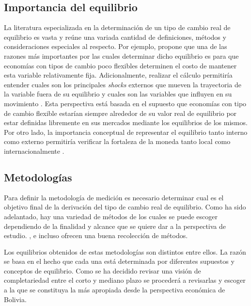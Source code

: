 \documentclass[12pt,letterpaper]{article}
\begin{document}
\subsection*{Importancia del equilibrio}
La literatura especializada en la determinación de un tipo de cambio real de equilibrio es vasta y reúne una variada cantidad de definiciones, métodos y consideraciones especiales al respecto. Por ejemplo, \cite{driver2005concepts} propone que una de las razones más importantes por las cuales determinar dicho equilibrio es para que economías con tipos de cambio poco flexibles determinen el costo de mantener esta variable relativamente fija. Adicionalmente, realizar el cálculo permitiría entender cuales son los principales \emph{shocks} externos que mueven la trayectoria de la variable fuera de su equilibrio y cuales son las variables que influyen en su movimiento \citep{macdonald2000concepts}. Esta perspectiva está basada en el supuesto que economías con tipo de cambio flexible estarían siempre alrededor de su valor real de equilibrio por estar definidas libremente en sus mercados mediante los equilibrios de los mismos. Por otro lado, la importancia conceptual de representar el equilibrio tanto interno como externo permitiría verificar la fortaleza de la moneda tanto local como internacionalmente \citep{akrama2003real}.

\subsection*{Metodologías}
Para definir la metodología de medición es necesario determinar cual es el objetivo final de la derivación del tipo de cambio real de equilibrio. Como ha sido adelantado, hay una variedad de métodos de los cuales se puede escoger dependiendo de la finalidad y alcance que se quiere dar a la perspectiva de estudio. \cite{driver2005concepts}, \cite{macdonald2000concepts} e incluso \cite{akrama2003real} ofrecen una buena recolección de métodos.

Los equilibrios obtenidos de estas metodologías son distintos entre ellos. La razón se basa en el hecho que cada una está determinada por diferentes supuestos y conceptos de equilibrio. Como se ha decidido revisar una visión de completariedad entre el corto y mediano plazo se procederá a revisarlas y escoger a la que se constituya la más apropiada desde la perspectiva económica de Bolivia.
\end{document}
